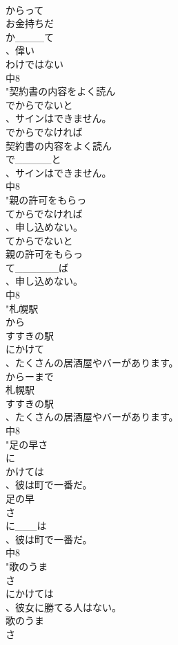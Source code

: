 \documentclass[8pt]{extreport}
\begin{document}
\begin{CJK}{UTF8}{min}
\\	からって
\\	お金持ちだ
\\	か____て
\\	、偉い
\\	わけではない
\\	中8
\\	"契約書の内容をよく読ん
\\	でからでないと
\\	、サインはできません。 
\\	でからでなければ
\\	契約書の内容をよく読ん
\\	で_____と
\\	、サインはできません。　
\\	中8
\\	"親の許可をもらっ
\\	てからでなければ
\\	、申し込めない。 
\\	てからでないと
\\	親の許可をもらっ
\\	て______ば
\\	、申し込めない。
\\	中8
\\	"札幌駅
\\	から
\\	すすきの駅
\\	にかけて
\\	、たくさんの居酒屋やバーがあります。
\\	からーまで 
\\	札幌駅
\\	すすきの駅
\\	、たくさんの居酒屋やバーがあります。
\\	中8
\\	"足の早さ
\\	に
\\	かけては
\\	、彼は町で一番だ。
\\	足の早
\\	さ
\\	に___は
\\	、彼は町で一番だ。
\\	中8
\\	"歌のうま
\\	さ
\\	にかけては
\\	、彼女に勝てる人はない。
\\	歌のうま
\\	さ

\end{CJK}
\end{document}

